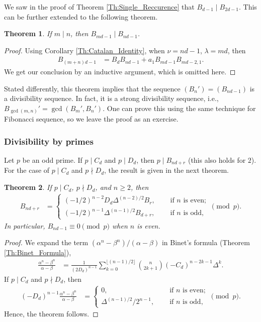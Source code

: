 \documentclass[12pt]{article}
\theoremstyle{plain}
\newtheorem{theorem}{Theorem}
\theoremstyle{definition}
\theoremstyle{remark}
\begin{document}
We saw in the proof of Theorem \ref{Th:Single_Reccurence} that $ B_{d - 1} \mid B_{2d - 1} $. This can be further extended to the following theorem.
\begin{theorem} If $ m \mid n $, then $ B_{md - 1} \mid B_{nd - 1} $.	
\end{theorem}
\begin{proof} Using Corollary \ref{Th:Catalan_Identity}, when $ \nu = nd - 1 $, $ \lambda = md $, then 
\begin{align*}
	B_{(m + n)d - 1} &= B_d B_{nd - 1} + a_1 B_{md - 1} B_{md - 2, 1}.
\end{align*}
We get our conclusion by an inductive argument, which is omitted here. 
\end{proof}
Stated differently, this theorem implies that the sequence $ (B_n') = (B_{nd - 1}) $ is a divisibility sequence. In fact, it is a strong divisibility sequence, i.e., $ B_{\gcd (m, n)}' = \gcd (B_m', B_n') $. One can prove this using the same technique for Fibonacci sequence, so we leave the proof as an exercise.

\subsubsection{Divisibility by primes} \label{Sec:Divisibility_by_Primes}

Let $ p $ be an odd prime. If $ p \mid C_d $ and $ p \mid D_d $, then $ p \mid B_{nd + r} $ (this also holds for $ 2 $). For the case of $ p \mid C_d $ and $ p \nmid D_d $, the result is given in the next theorem.
\begin{theorem} If $ p \mid C_d $, $ p \nmid D_d $, and $ n \geq 2 $, then
\begin{align*}
	B_{nd + r} &= \begin{cases} (-1/2)^{n - 2} D_d \Delta^{(n - 2)/2} B_r, \quad &\text{ if } n \text{ is even}; \\ (-1/2)^{n - 1} \Delta^{(n - 1)/2} B_{d + r}, \quad &\text{ if } n \text{ is odd}, \end{cases} \pmod{p}.
\end{align*}
In particular, $ B_{nd - 1} \equiv 0 \pmod{p} $ when $ n $ is even.
\end{theorem}

\begin{proof}
We expand the term $ (\alpha^n - \beta^n)/(\alpha - \beta) $ in Binet's formula (Theorem \ref{Th:Binet_Formula}),
\begin{align*}
	\frac{\alpha^n - \beta^n}{\alpha - \beta} &= \frac{1}{(2D_d)^{n - 1}} \sum_{k = 0}^{\lfloor (n - 1)/2 \rfloor} \binom{n}{2k + 1} (-C_d)^{n - 2k - 1} \Delta^k.
\end{align*}
If $ p \mid C_d $ and $ p \nmid D_d $, then
\begin{align*}
	(-D_d)^{n - 1} \frac{\alpha^n - \beta^n}{\alpha - \beta} &= \begin{cases} 0, \quad &\text{ if } n \text{ is even}; \\ \Delta^{(n - 1)/2}/2^{n - 1}, \quad &\text{ if } n \text{ is odd}, \end{cases} \pmod{p}.
\end{align*}
Hence, the theorem follows.
\end{proof}
\end{document}
